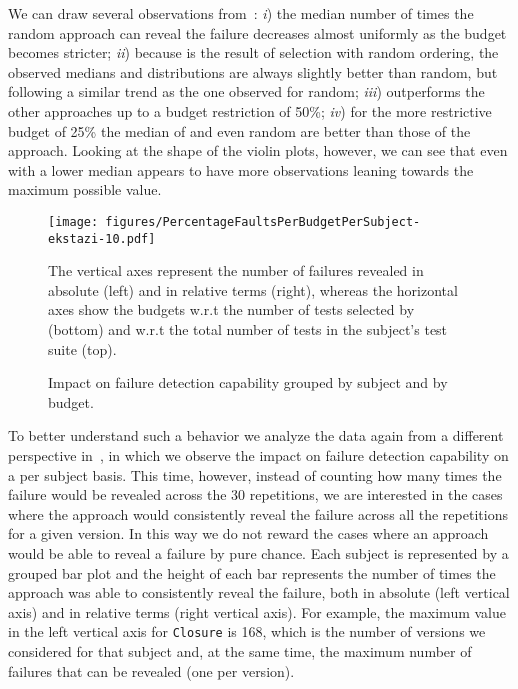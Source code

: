 We can draw several observations from~:
\textit{i}) the median number of times the random approach can reveal the failure decreases almost uniformly as the budget becomes  stricter;
\textit{ii}) because \ekr is the result of \ek selection with random ordering, the observed medians and distributions 
are always slightly better than random, but following a similar trend as the one observed for random;
\textit{iii}) \fz outperforms the other approaches up to a budget restriction of 50\%;
\textit{iv}) for the more restrictive budget of 25\% the median of \ekr and even random are better than those of the \fz approach.
Looking at the shape of the violin plots, however, we can see that even with a lower median  \fz  appears to have more observations leaning towards the maximum possible value.

\begin{figure*}[h]
  \centering
  \texttt{[image: figures/PercentageFaultsPerBudgetPerSubject-ekstazi-10.pdf]}
  \begin{flushleft}
	\footnotesize
	The vertical axes represent the number of failures revealed in absolute (left) and in relative terms (right),
	whereas the horizontal axes show the budgets w.r.t the number of tests selected by \ek (bottom) and w.r.t the total number of tests in the subject's test suite (top).
  \end{flushleft}
  \caption{Impact on failure detection capability grouped by subject and by budget.}
  \label{fig:persubject}
\end{figure*}

To better understand such a behavior we analyze the data again from a different perspective in~, in which 
we observe the impact on failure detection capability on a per subject basis.
This time, however, instead of counting how many times the failure would be revealed across the 30 repetitions,
we are interested in the cases where the approach would consistently reveal the failure across all the repetitions for a given version.
In this way we do not reward the cases where an approach would be able to reveal a failure by pure chance. 
Each subject is represented by a grouped bar plot and the height of each bar
represents the number of times the approach was able to consistently reveal the failure, 
both in absolute (left vertical axis) and in relative terms (right vertical axis).
For example, the maximum value in the left vertical axis for \texttt{Closure} is 168, 
which is the number of versions we considered for that subject and, at the same time, the maximum number of failures that can be revealed (one per version).

